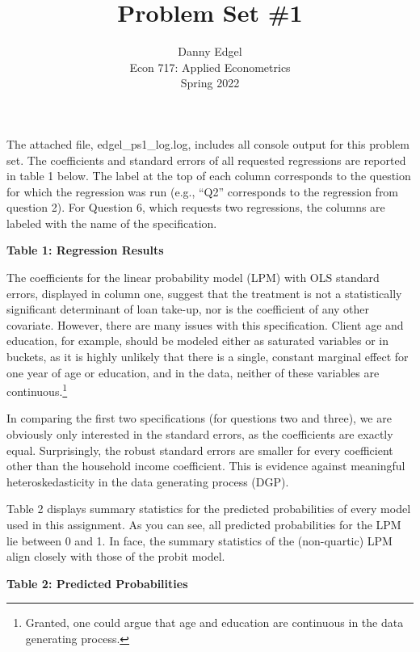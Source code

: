 \documentclass{article}
\begin{document}
\title{	Problem Set \#1 }
\author{ 	Danny Edgel 			\\ 
		Econ 717: Applied Econometrics	\\
		Spring 2022						
		}
\maketitle\thispagestyle{empty}


\noindent The attached file, edgel\_ps1\_log.log, includes all console output for this problem set. The coefficients and standard errors of all requested regressions are reported in table 1 below. The label at the top of each column corresponds to the question for which the regression was run (e.g., ``Q2'' corresponds to the regression from question 2). For Question 6, which requests two regressions, the columns are labeled with the name of the specification. 
\begin{center}
        \textbf{Table 1: Regression Results} \\\medskip
{\small
        
}
\end{center}

The coefficients for the linear probability model (LPM) with OLS standard errors, displayed in column one, suggest that the treatment is not a statistically significant determinant of loan take-up, nor is the coefficient of any other covariate. However, there are many issues with this specification. Client age and education, for example, should be modeled either as saturated variables or in buckets, as it is highly unlikely that there is a single, constant marginal effect for one year of age or education, and in the data, neither of these variables are continuous.\footnote{Granted, one could argue that age and education are continuous in the data generating process.}

In comparing the first two specifications (for questions two and three), we are obviously only interested in the standard errors, as the coefficients are exactly equal. Surprisingly, the robust standard errors are smaller for every coefficient other than the household income coefficient. This is evidence against meaningful heteroskedasticity in the data generating process (DGP).

Table 2 displays summary statistics for the predicted probabilities of every model used in this assignment. As you can see, all predicted probabilities for the LPM lie between 0 and 1. In face, the summary statistics of the (non-quartic) LPM align closely with those of the probit model.
\begin{center}
        \textbf{Table 2: Predicted Probabilities} \\\medskip
        
\end{center}
\end{document}
